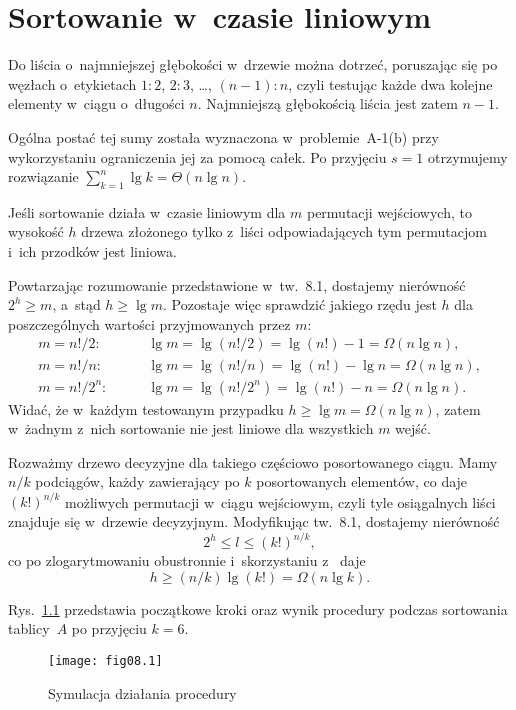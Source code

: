 \chapter{Sortowanie w~czasie liniowym}


\exercise %
Do liścia o~najmniejszej głębokości w~drzewie można dotrzeć, poruszając się po węzłach o~etykietach $1:2$, $2:3$, \dots, $(n-1):n$, czyli testując każde dwa kolejne elementy w~ciągu o~długości $n$. Najmniejszą głębokością liścia jest zatem $n-1$.

\exercise %
Ogólna postać tej sumy została wyznaczona w~problemie~A-1(b) przy wykorzystaniu ograniczenia jej za pomocą całek. Po przyjęciu $s=1$ otrzymujemy rozwiązanie $\sum_{k=1}^n\lg k=\Theta(n\lg n)$.

\exercise %
Jeśli sortowanie działa w~czasie liniowym dla $m$ permutacji wejściowych, to wysokość $h$ drzewa złożonego tylko z~liści odpowiadających tym permutacjom i~ich przodków jest liniowa.

Powtarzając rozumowanie przedstawione w~tw.~8.1, dostajemy nierówność $2^h\ge m$, a~stąd $h\ge\lg m$. Pozostaje więc sprawdzić jakiego rzędu jest $h$ dla poszczególnych wartości przyjmowanych przez $m$:
\begin{align*}
	m = n!/2: &\qquad \lg m = \lg(n!/2) = \lg(n!)-1 = \Omega(n\lg n), \\
	m = n!/n: &\qquad \lg m = \lg(n!/n) = \lg(n!)-\lg n = \Omega(n\lg n), \\
	m = n!/2^n: &\qquad \lg m = \lg(n!/2^n) = \lg(n!)-n = \Omega(n\lg n).
\end{align*}
Widać, że w~każdym testowanym przypadku $h\ge\lg m=\Omega(n\lg n)$, zatem w~żadnym z~nich sortowanie nie jest liniowe dla wszystkich $m$ wejść.

\exercise %
Rozważmy drzewo decyzyjne dla takiego częściowo posortowanego ciągu. Mamy $n/k$ podciągów, każdy zawierający po $k$ posortowanych elementów, co daje $(k!)^{n/k}$ możliwych permutacji w~ciągu wejściowym, czyli tyle osiągalnych liści znajduje się w~drzewie decyzyjnym. Modyfikując tw.~8.1, dostajemy nierówność
\[
	2^h \le l \le (k!)^{n/k},
\]
co po zlogarytmowaniu obustronnie i~skorzystaniu z~ daje
\[
	h \ge (n/k)\lg(k!) = \Omega(n\lg k).
\]


\exercise %
Rys.~\ref{fig:8.2-1} przedstawia początkowe kroki oraz wynik procedury  podczas sortowania tablicy~$A$ po przyjęciu $k=6$.
\begin{figure}[ht]
	\begin{center}
		\texttt{[image: fig08.1]}
	\end{center}
	\caption{Symulacja działania procedury } \label{fig:8.2-1}
\end{figure}

